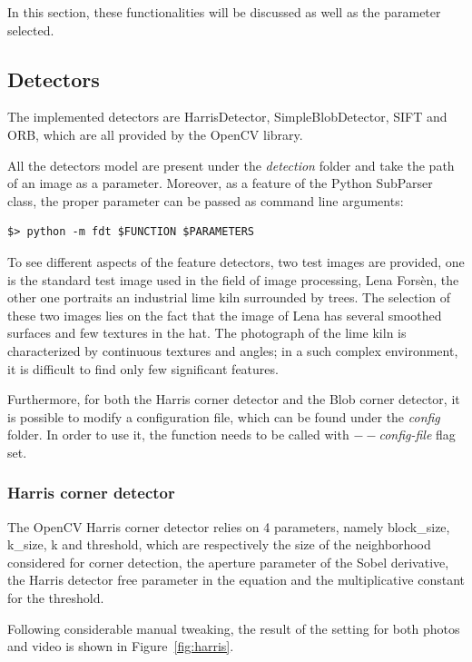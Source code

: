 \documentclass[journal]{IEEEtran}
\begin{document}
In this section, these functionalities will be discussed as well as the parameter selected.

\subsection{Detectors}
The implemented detectors are HarrisDetector, SimpleBlobDetector, SIFT and ORB, which are all provided by the OpenCV library.

All the detectors model are present under the \emph{detection} folder and take the path of an image as a parameter. Moreover, as a feature of the Python SubParser class, the proper parameter can be passed as command line arguments:

\begin{verbatim}
$> python -m fdt $FUNCTION $PARAMETERS
\end{verbatim}

To see different aspects of the feature detectors, two test images are provided, one is the standard test image used in the field of image processing, Lena Forsèn, the other one portraits an industrial lime kiln surrounded by trees. The selection of these two images lies on the fact that the image of Lena has several smoothed surfaces and few textures in the hat. The photograph of the lime kiln is characterized by continuous textures and angles; in a such complex environment, it is difficult to find only few significant features.

Furthermore, for both the Harris corner detector and the Blob corner detector, it is possible to modify a configuration file, which can be found under the \emph{config} folder. In order to use it, the function needs to be called with \emph{$--$config-file} flag set.

\subsubsection{Harris corner detector}

The OpenCV Harris corner detector relies on 4 parameters, namely block\_size, k\_size, k and threshold, which are respectively the size of the neighborhood considered for corner detection, the aperture parameter of the Sobel derivative, the Harris detector free parameter in the equation and the multiplicative constant for the threshold.

Following considerable manual tweaking, the result of the setting for both photos and video is shown in Figure~\ref{fig:harris}.
\end{document}
